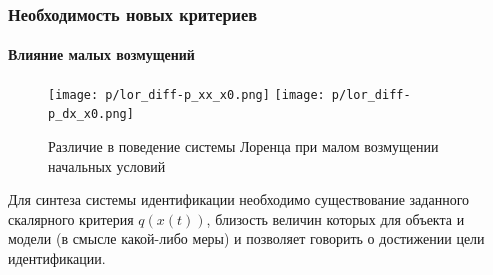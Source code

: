 \documentclass[10pt,utf8]{beamer}
\begin{document}



\begin{frame}
  \frametitle{Необходимость новых критериев}
  \framesubtitle{Влияние малых возмущений}

  \begin{figure}[h!]
    \centerline{
      \texttt{[image: p/lor\_diff-p\_xx\_x0.png]}
      \hfill
      \texttt{[image: p/lor\_diff-p\_dx\_x0.png]}
    }
    \caption{Различие в поведение системы Лоренца при малом возмущении начальных условий}
    \label{atu:f:lor_diff_x0}
  \end{figure}

  \vspace{-5ex}

  Для синтеза системы идентификации необходимо существование
  заданного скалярного критерия $q(x(t))$, близость величин
  которых для объекта и модели (в смысле какой-либо меры)
  и позволяет говорить о достижении цели идентификации.

\end{frame}



%
%
%
%

%
%
%
%
%


\end{document}
